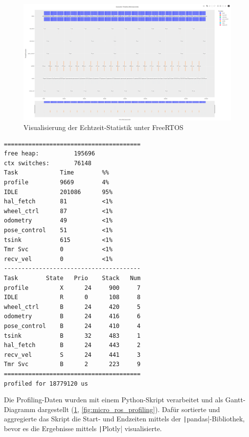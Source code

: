 \begin{figure}[h]
    \centering
    \includegraphics[width=1\textwidth]{assets/freertos_profiling}
    \caption{Visualisierung der Echtzeit-Statistik unter FreeRTOS}
    \label{fig:freertos_profiling}
\end{figure}

\begin{code}
\begin{verbatim}
=======================================
free heap:          195696
ctx switches:       76148
Task            Time        %%
profile         9669        4%
IDLE            201086      95%
hal_fetch       81          <1%
wheel_ctrl      87          <1%
odometry        49          <1%
pose_control    51          <1%
tsink           615         <1%
Tmr Svc         0           <1%
recv_vel        0           <1%
---------------------------------------
Task        State   Prio    Stack   Num
profile         X      24     900     7
IDLE            R      0      108     8
wheel_ctrl      B      24     420     5
odometry        B      24     416     6
pose_control    B      24     410     4
tsink           B      32     483     1
hal_fetch       B      24     443     2
recv_vel        S      24     441     3
Tmr Svc         B      2      223     9
=======================================
profiled for 18779120 us
\end{verbatim}
    \label{code:freertos_summary_freertos}
\end{code}

Die Profiling-Daten wurden mit einem Python-Skript verarbeitet und als
Gantt-Diagramm dargestellt (\ref{fig:freertos_profiling},
\ref{fig:micro_ros_profiling}). Dafür sortierte und aggregierte das Skript die
Start- und Endzeiten mittels der \texttt|pandas|-Bibliothek, bevor es
die Ergebnisse mittels \texttt|Plotly| visualisierte.

